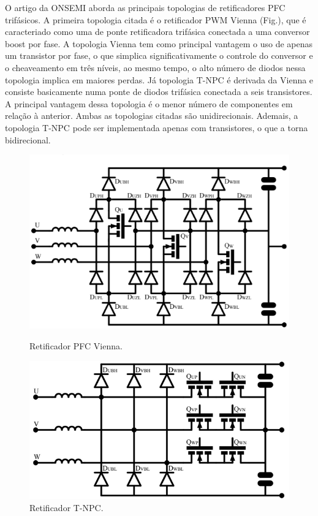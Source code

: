 O artigo da ONSEMI \cite{} aborda as principais topologias de retificadores PFC trifásicos. A primeira topologia citada é o retificador PWM Vienna (Fig.), que é caracteriado como uma de ponte retificadora trifásica conectada a uma conversor boost por fase. A topologia Vienna tem como principal vantagem o uso de apenas um transistor por fase, o que simplica significativamente o controle do conversor e o cheaveamento em três níveis, ao mesmo tempo, o alto número de diodos nessa topologia implica em maiores perdas. Já topologia T-NPC é derivada da Vienna e consiste basicamente numa ponte de diodos trifásica conectada a seis transistores. A principal vantagem dessa topologia é o menor número de componentes em relação à anterior. Ambas as topologias citadas são unidirecionais. Ademais, a topologia T-NPC pode ser implementada apenas com transistores, o que a torna bidirecional.

\begin{figure}[h]
	\centering
	\begin{minipage}{0.45\textwidth}
		\centering
		\includegraphics[width=\textwidth]{./Figuras/PFC_Vienna.png}
		\caption{Retificador PFC Vienna.}
		\label{fig:pfc_vienna}
	\end{minipage}
	\hfill
	\begin{minipage}{0.45\textwidth}
		\centering
		\includegraphics[width=\textwidth]{./Figuras/PFC_TNPC.png}
		\caption{Retificador T-NPC.}
		\label{fig:pfc_tnpc}
	\end{minipage}
\end{figure}

